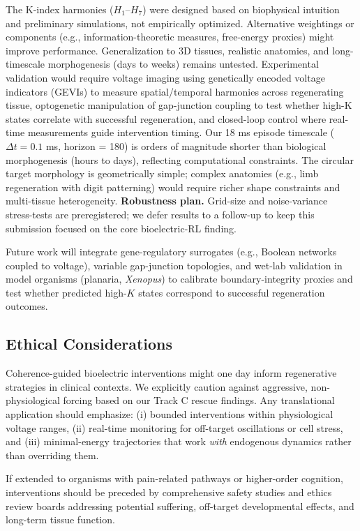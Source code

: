 \documentclass[10pt,letterpaper]{article}
\begin{document}
The K-index harmonies ($H_1$–$H_7$) were designed based on biophysical intuition and preliminary simulations, not empirically optimized. Alternative weightings or components (e.g., information-theoretic measures, free-energy proxies) might improve performance. Generalization to 3D tissues, realistic anatomies, and long-timescale morphogenesis (days to weeks) remains untested. Experimental validation would require voltage imaging using genetically encoded voltage indicators (GEVIs) to measure spatial/temporal harmonies across regenerating tissue, optogenetic manipulation of gap-junction coupling to test whether high-K states correlate with successful regeneration, and closed-loop control where real-time measurements guide intervention timing. Our 18 ms episode timescale ($\Delta t = 0.1$ ms, horizon = 180) is orders of magnitude shorter than biological morphogenesis (hours to days), reflecting computational constraints. The circular target morphology is geometrically simple; complex anatomies (e.g., limb regeneration with digit patterning) would require richer shape constraints and multi-tissue heterogeneity. \textbf{Robustness plan.} Grid-size and noise-variance stress-tests are preregistered; we defer results to a follow-up to keep this submission focused on the core bioelectric-RL finding.

Future work will integrate gene-regulatory surrogates (e.g., Boolean networks coupled to voltage), variable gap-junction topologies, and wet-lab validation in model organisms (planaria, \textit{Xenopus}) to calibrate boundary-integrity proxies and test whether predicted high-$K$ states correspond to successful regeneration outcomes.

\subsection*{Ethical Considerations}

Coherence-guided bioelectric interventions might one day inform regenerative strategies in clinical contexts. We explicitly caution against aggressive, non-physiological forcing based on our Track C rescue findings. Any translational application should emphasize: (i) bounded interventions within physiological voltage ranges, (ii) real-time monitoring for off-target oscillations or cell stress, and (iii) minimal-energy trajectories that work \emph{with} endogenous dynamics rather than overriding them.

If extended to organisms with pain-related pathways or higher-order cognition, interventions should be preceded by comprehensive safety studies and ethics review boards addressing potential suffering, off-target developmental effects, and long-term tissue function.
\end{document}
